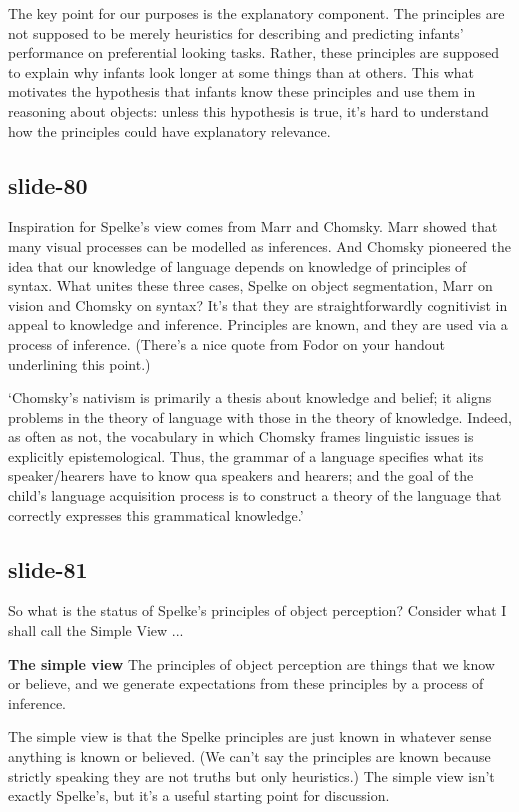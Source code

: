 \documentclass[12pt,\papersize]{extarticle}
\begin{document}
The key point for our purposes is the explanatory component.
The principles are not supposed to be merely heuristics for describing and predicting infants’ 
performance on preferential looking tasks.
Rather, these principles are supposed to explain why infants look longer at some things than at 
others.
This what motivates the hypothesis that infants know these principles and use them in 
reasoning about objects: unless this hypothesis is true, it’s hard to understand how the 
principles could have explanatory relevance.
 
\subsection{slide-80}
Inspiration for Spelke’s view comes from Marr and Chomsky.
Marr showed that many visual processes can be modelled as inferences.
And Chomsky pioneered the idea that our knowledge of language depends on knowledge of 
principles of syntax.
What unites these three cases, Spelke on object segmentation, Marr on vision and Chomsky on 
syntax?
It’s that they are straightforwardly cognitivist in appeal to knowledge and inference.
Principles are known, and they are used via a process of inference.
(There’s a nice quote from Fodor on your handout underlining this point.)
 
‘Chomsky’s nativism is primarily a thesis about knowledge and belief; it aligns problems 
in the theory of language with those in the theory of knowledge.  Indeed, as often as not, 
the vocabulary in which Chomsky frames linguistic issues is explicitly epistemological.  
Thus, the grammar of a language specifies what its speaker/hearers have to know qua speakers 
and hearers; and the goal of the child’s language acquisition process is to construct a 
theory of the language that correctly expresses this grammatical knowledge.’
\citep[p.\ 11]{Fodor:2000cj}
 
\subsection{slide-81}
So what is the status of Spelke’s principles of object perception?
Consider what I shall call the Simple View ...
 
\textbf{The simple view}
The principles of object perception are things that we know or believe, 
and we generate expectations from these principles by a process of inference.
 
The simple view is that the Spelke principles are just known in whatever sense anything is 
known or believed.
(We can't say the principles are known because strictly speaking they are not truths but only
heuristics.)
The simple view isn’t exactly Spelke’s, but it’s a useful starting point for discussion.
 
\end{document}
